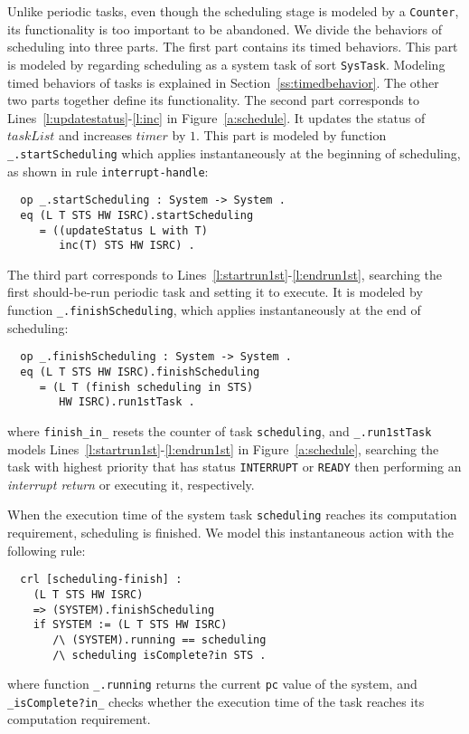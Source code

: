 \documentclass[10pt,journal]{IEEEtran}
\newcommand{\hide}[1]{\ignorespaces}
\begin{document}
{Unlike periodic tasks, even though the scheduling stage is modeled by
a \verb|Counter|, its functionality is too important to be abandoned.
We divide the behaviors of scheduling into three parts.  The first
part contains its timed behaviors. This part is modeled by regarding
scheduling as a system task of sort \verb|SysTask|. Modeling timed
behaviors of tasks is explained in Section~\ref{ss:timedbehavior}.
The other two parts together define its functionality. The second part
corresponds to Lines~\ref{l:updatestatus}-\ref{l:inc} in
Figure~\ref{a:schedule}. It updates the status of $taskList$ and
increases $timer$ by $1$. This part is modeled by function
\verb|_.startScheduling| which applies instantaneously at the
beginning of scheduling, as shown in rule \verb|interrupt-handle|:
\begin{verbatim}
  op _.startScheduling : System -> System .
  eq (L T STS HW ISRC).startScheduling 
     = ((updateStatus L with T) 
        inc(T) STS HW ISRC) .
\end{verbatim}
The third part corresponds to
Lines~\ref{l:startrun1st}-\ref{l:endrun1st}, searching the first
should-be-run periodic task and setting it to execute. It is modeled
by function \verb|_.finishScheduling|, which applies instantaneously
at the end of scheduling:
\begin{verbatim}
  op _.finishScheduling : System -> System .
  eq (L T STS HW ISRC).finishScheduling
     = (L T (finish scheduling in STS) 
        HW ISRC).run1stTask .
\end{verbatim}
where \verb|finish_in_| resets the counter of task \verb|scheduling|,
and \verb|_.run1stTask| models
Lines~\ref{l:startrun1st}-\ref{l:endrun1st} in
Figure~\ref{a:schedule}, searching the task with highest priority
that has status \verb|INTERRUPT| or \verb|READY| then performing an
\emph{interrupt return} or executing it, respectively.

When the execution time of the system task \verb|scheduling| reaches
its computation requirement, scheduling is finished. We model this
instantaneous action with the following rule:
\begin{verbatim}
  crl [scheduling-finish] :
    (L T STS HW ISRC) 
    => (SYSTEM).finishScheduling
    if SYSTEM := (L T STS HW ISRC) 
       /\ (SYSTEM).running == scheduling 
       /\ scheduling isComplete?in STS .
\end{verbatim}
where function \verb|_.running| returns the current \verb|pc| value of
the system, and \verb|_isComplete?in_| checks whether the execution
time of the task reaches its computation requirement.  
\hide{
\begin{verbatim}
  op _mayFinish?in_ : Oid SysTasks ~> Bool .
  eq O mayFinish?in [ < O : SysTask | cnt : C > REST ] 
       = C mayFinish? .
  op _mayFinish? : Counter -> Bool .
  eq [ R / [ MIN , MAX ] ] mayFinish?
       = if R lt MIN then false else true fi .
\end{verbatim}}

}
\end{document}
